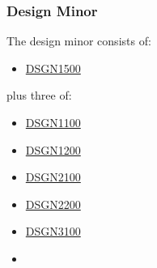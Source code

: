 \documentclass[a4paper,12pt]{report}
\begin{document}
\subsubsection{Design Minor}
The design minor consists of:
\begin{itemize}
    \item \hyperlink{DSGN1500}{DSGN1500}
\end{itemize}
plus three of:
\begin{multicols}{3}
    \begin{itemize}
        \item \hyperlink{DSGN1100}{DSGN1100}
        \item \hyperlink{DSGN1200}{DSGN1200}
        \item \hyperlink{DSGN2100}{DSGN2100}
        \item \hyperlink{DSGN2200}{DSGN2200}
        \item \hyperlink{DSGN3100}{DSGN3100}
        \item[]
    \end{itemize}
\end{multicols}
\end{document}
